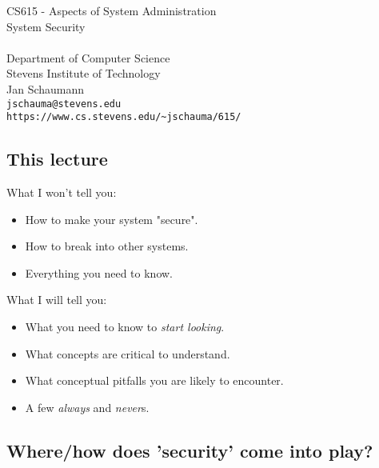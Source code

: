 \documentclass[xga]{xdvislides}
\begin{document}
\setfontphv

\lhead{\slidetitle}                               %
\cfoot{\relax}                               %
\rfoot{\Gray{\today}}
\vspace*{\fill}
\begin{center}
	\Hugesize
		CS615 - Aspects of System Administration\\ [1em]
		System Security\\ [1em]
	\hspace*{5mm}\blueline\\ [1em]
	\Normalsize
		Department of Computer Science\\
		Stevens Institute of Technology\\
		Jan Schaumann\\
		\verb+jschauma@stevens.edu+ \\
		\verb+https://www.cs.stevens.edu/~jschauma/615/+
\end{center}
\vspace*{\fill}

\subsection{This lecture}
What I won't tell you:
\begin{itemize}
	\item How to make your system "secure".
	\item How to break into other systems.
	\item Everything you need to know.
\end{itemize}
\vspace{.5in}
What I will tell you:
\begin{itemize}
	\item What you need to know to {\em start looking}.
	\item What concepts are critical to understand.
	\item What conceptual pitfalls you are likely to encounter.
	\item A few {\em always} and {\em never}s.
\end{itemize}


\subsection{Where/how does 'security' come into play?}
\end{document}
